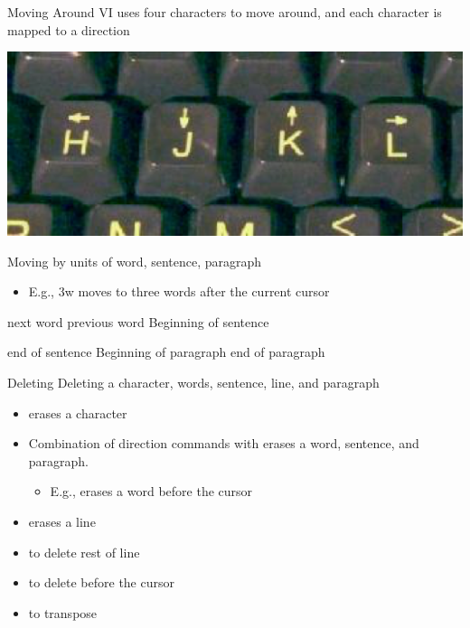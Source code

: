 \documentclass[newPxFont,sthlmFooter,nooffset]{beamer}
\begin{document}
\begin{frame}[t]{Moving Around}
VI uses four characters to move around, and each character is mapped to a direction

\begin{center}
 \includegraphics[width=0.7\linewidth]{./figure/vi_directions.png}
\end{center}

Moving by units of word, sentence, paragraph
\begin{itemize}
\item E.g., 3w moves to three words after the current cursor
\end{itemize}


 next word \hfill {} previous word \hfill \keystroke{(} Beginning of sentence 

\bigskip
\keystroke{)} end of sentence \hfill \keystroke{\{} Beginning of paragraph \hfill \keystroke{\}} end of paragraph 
\end{frame}


\begin{frame}[t]{Deleting}
Deleting a character, words, sentence, line, and paragraph
\begin{itemize}
 \item {} erases a character
 \item Combination of direction commands with  erases a word, sentence, and paragraph.
\begin{itemize}
\item E.g.,  erases a word before the cursor
\end{itemize}
 \item {} erases a line
 \item {} to delete rest of line
 \item {} to delete before the cursor
 \item {} to transpose
\end{itemize}

\end{frame}
\end{document}
